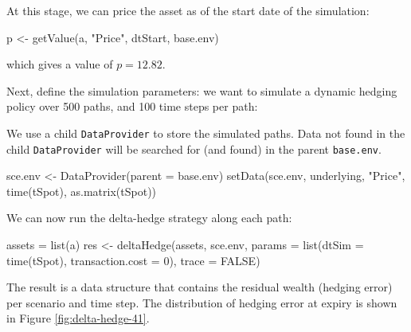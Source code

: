 \documentclass[justified]{tufte-book}
\newenvironment{Shaded}{}{}
\newcommand{\AttributeTok}[1]{\textcolor[rgb]{0.49,0.56,0.16}{#1}}
\newcommand{\ConstantTok}[1]{\textcolor[rgb]{0.53,0.00,0.00}{#1}}
\newcommand{\DecValTok}[1]{\textcolor[rgb]{0.25,0.63,0.44}{#1}}
\newcommand{\FunctionTok}[1]{\textcolor[rgb]{0.02,0.16,0.49}{#1}}
\newcommand{\NormalTok}[1]{#1}
\newcommand{\OtherTok}[1]{\textcolor[rgb]{0.00,0.44,0.13}{#1}}
\newcommand{\SpecialCharTok}[1]{\textcolor[rgb]{0.25,0.44,0.63}{#1}}
\newcommand{\StringTok}[1]{\textcolor[rgb]{0.25,0.44,0.63}{#1}}
\newcommand{\class}[1]{\texttt{#1}}
\newcommand{\code}[1]{\texttt{#1}\index{#1}}
\begin{document}
At this stage, we can price the asset as of the start date of the
simulation:

\begin{Shaded}
\begin{Highlighting}[]
\NormalTok{p }\OtherTok{\textless{}{-}} \FunctionTok{getValue}\NormalTok{(a, }\StringTok{"Price"}\NormalTok{, dtStart, base.env)}
\end{Highlighting}
\end{Shaded}

which gives a value of \(p = 12.82\).

Next, define the simulation parameters: we want to simulate a dynamic
hedging policy over 500 paths, and 100 time steps per path:

We use a child \class{DataProvider} to store the simulated paths. Data not found in the child \class{DataProvider}
will be searched for (and found) in the parent \code{base.env}.

\begin{Shaded}
\begin{Highlighting}[]
\NormalTok{sce.env }\OtherTok{\textless{}{-}} \FunctionTok{DataProvider}\NormalTok{(}\AttributeTok{parent =}\NormalTok{ base.env)}
\FunctionTok{setData}\NormalTok{(sce.env, underlying, }\StringTok{"Price"}\NormalTok{, }\FunctionTok{time}\NormalTok{(tSpot),}
    \FunctionTok{as.matrix}\NormalTok{(tSpot))}
\end{Highlighting}
\end{Shaded}

We can now run the delta-hedge strategy along each path:

\begin{Shaded}
\begin{Highlighting}[]
\NormalTok{assets }\OtherTok{=} \FunctionTok{list}\NormalTok{(a)}
\NormalTok{res }\OtherTok{\textless{}{-}} \FunctionTok{deltaHedge}\NormalTok{(assets, sce.env, }\AttributeTok{params =} \FunctionTok{list}\NormalTok{(}\AttributeTok{dtSim =} \FunctionTok{time}\NormalTok{(tSpot),}
    \AttributeTok{transaction.cost =} \DecValTok{0}\NormalTok{), }\AttributeTok{trace =} \ConstantTok{FALSE}\NormalTok{)}
\end{Highlighting}
\end{Shaded}

The result is a data structure that contains the residual wealth
(hedging error) per scenario and time step. The distribution of hedging
error at expiry is shown in Figure \ref{fig:delta-hedge-41}.

\begin{Shaded}
\end{Shaded}
\end{document}
